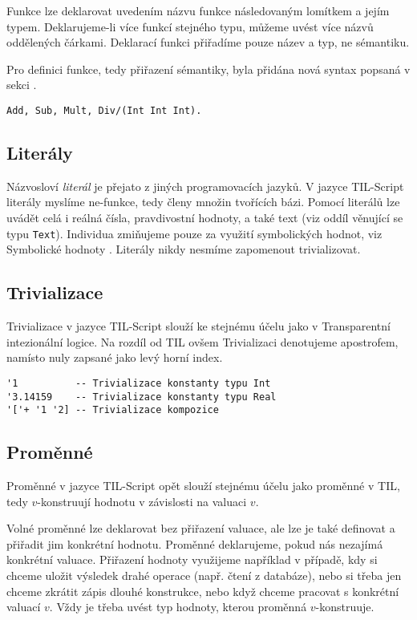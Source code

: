 Funkce lze deklarovat uvedením názvu funkce následovaným lomítkem a jejím typem. Deklarujeme-li
více funkcí stejného typu, můžeme uvést více názvů oddělených čárkami. Deklarací funkci přiřadíme
pouze název a typ, ne sémantiku.

Pro definici funkce, tedy přiřazení sémantiky, byla přidána nová syntax popsaná v sekci
.

\begin{lstlisting}[caption={Deklarace funkcí}]
Add, Sub, Mult, Div/(Int Int Int).
\end{lstlisting}

\subsection{Literály}

Názvosloví \textit{literál} je přejato z jiných programovacích jazyků. V jazyce TIL-Script literály
myslíme ne-funkce, tedy členy množin tvořících bázi. Pomocí literálů lze uvádět celá i reálná
čísla, pravdivostní hodnoty, a také text (viz oddíl  věnující se typu
\lstinline{Text}). Individua zmiňujeme pouze za využití symbolických hodnot, viz Symbolické hodnoty
. Literály nikdy nesmíme zapomenout trivializovat.

\subsection{Trivializace}

Trivializace v jazyce TIL-Script slouží ke stejnému účelu jako v Transparentní intezionální logice.
Na rozdíl od TIL ovšem Trivializaci denotujeme apostrofem, namísto nuly zapsané jako levý horní
index.

\begin{lstlisting}[caption={Příklad Trivializace.}]
'1          -- Trivializace konstanty typu Int
'3.14159    -- Trivializace konstanty typu Real
'['+ '1 '2] -- Trivializace kompozice
\end{lstlisting}

\subsection{Proměnné}

Proměnné v jazyce TIL-Script opět slouží stejnému účelu jako proměnné v TIL, tedy $v$-konstruují
hodnotu v závislosti na valuaci $v$.

Volné proměnné lze deklarovat bez přiřazení valuace, ale lze je také definovat a přiřadit jim
konkrétní hodnotu. Proměnné deklarujeme, pokud nás nezajímá konkrétní valuace. Přiřazení hodnoty
využijeme například v případě, kdy si chceme uložit výsledek drahé operace (např. čtení
z databáze), nebo si třeba jen chceme zkrátit zápis dlouhé konstrukce, nebo když chceme pracovat
s konkrétní valuací $v$. Vždy je třeba uvést typ hodnoty, kterou proměnná $v$-konstruuje.

